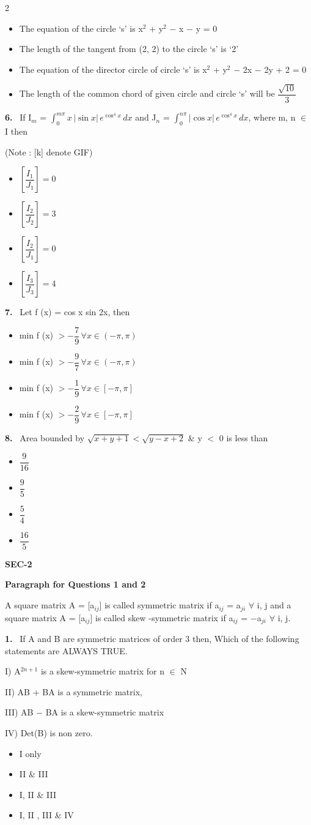 \documentclass[10pt]{extarticle}
\newcommand{\sect}[1]{\par\smallskip\noindent\textbf{#1}\par}
\newcommand{\qn}[1]{\par\smallskip\noindent\textbf{#1.}~}
\newcommand{\paraq}[2]{\par\smallskip\noindent\textbf{Paragraph for Questions #1 and #2}\par}
\newenvironment{qoptions}{\begin{itemize}[leftmargin=1.8em,itemsep=1pt,topsep=2pt,label={}]}{\end{itemize}}
\newcommand{\opt}[2]{\item[(#1)] #2}
\begin{document}
\begin{multicols}{2}
\begin{qoptions}
\opt{A}{The equation of the circle `s' is x$^2$ + y$^2$ $-$ x $-$ y = 0}
\opt{B}{The length of the tangent from (2, 2) to the circle `s' is `2'}
\opt{C}{The equation of the director circle of circle `s' is x$^2$ + y$^2$ $-$ 2x $-$ 2y + 2 = 0}
\opt{D}{The length of the common chord of given circle and circle `s' will be $\dfrac{\sqrt{10}}{3}$}
\end{qoptions}
\qn{6} If I$_m$ = $\displaystyle\int_0^{m\pi} x\,|\sin x|\,e^{\cos^4 x}\,dx$ and J$_n$ = $\displaystyle\int_0^{n\pi} |\cos x|\,e^{\cos^4 x}\,dx$, where m, n $\in$ I then\par
(Note : [k] denote GIF)
\begin{qoptions}
\opt{A}{$\left[\dfrac{I_1}{J_1}\right] = 0$}
\opt{B}{$\left[\dfrac{I_2}{J_2}\right] = 3$}
\opt{C}{$\left[\dfrac{I_2}{J_1}\right] = 0$}
\opt{D}{$\left[\dfrac{I_3}{J_3}\right] = 4$}
\end{qoptions}
\qn{7} Let f (x) = cos x sin 2x, then
\begin{qoptions}
\opt{A}{min f (x) $> -\dfrac{7}{9}\,\forall x \in (-\pi, \pi)$}
\opt{B}{min f (x) $> -\dfrac{9}{7}\,\forall x \in (-\pi, \pi)$}
\opt{C}{min f (x) $> -\dfrac{1}{9}\,\forall x \in [-\pi, \pi]$}
\opt{D}{min f (x) $> -\dfrac{2}{9}\,\forall x \in [-\pi, \pi]$}
\end{qoptions}
\qn{8} Area bounded by $\sqrt{x + y + 1} < \sqrt{y - x + 2}$ \& y $<$ 0 is less than
\begin{qoptions}
\opt{A}{$\dfrac{9}{16}$}
\opt{B}{$\dfrac{9}{5}$}
\opt{C}{$\dfrac{5}{4}$}
\opt{D}{$\dfrac{16}{5}$}
\end{qoptions}
\sect{SEC-2}
\paraq{1}{2}A square matrix A = [a$_{ij}$] is called symmetric matrix if a$_{ij}$ = a$_{ji}$ $\forall$ i, j and a square matrix A = [a$_{ij}$] is called skew -symmetric matrix if a$_{ij}$ = $-$a$_{ji}$ $\forall$ i, j.\par
\qn{1} If A and B are symmetric matrices of order 3 then, Which of the following statements are ALWAYS TRUE.\par
I) A$^{2n+1}$ is a skew-symmetric matrix for n $\in$ N\par
II) AB + BA is a symmetric matrix,\par
III) AB $-$ BA is a skew-symmetric matrix\par
IV) Det(B) is non zero.
\begin{qoptions}
\opt{A}{I only}
\opt{B}{II \& III}
\opt{C}{I, II \& III}
\opt{D}{I, II , III \& IV}
\end{qoptions}

\end{multicols}
\end{document}
